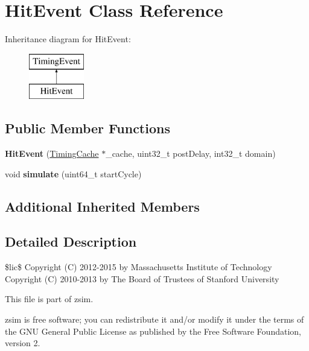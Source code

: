 \hypertarget{classHitEvent}{\section{Hit\-Event Class Reference}
\label{classHitEvent}
}
Inheritance diagram for Hit\-Event\-:\begin{figure}[H]
\begin{center}
\leavevmode
\includegraphics[height=2.000000cm]{classHitEvent}
\end{center}
\end{figure}
\subsection*{Public Member Functions}
\begin{DoxyCompactItemize}
\item 
\hypertarget{classHitEvent_a1a3c3935f5eab43937c515af8d67928d}{{\bfseries Hit\-Event} (\hyperlink{classTimingCache}{Timing\-Cache} $\ast$\-\_\-cache, uint32\-\_\-t post\-Delay, int32\-\_\-t domain)}\label{classHitEvent_a1a3c3935f5eab43937c515af8d67928d}

\item 
\hypertarget{classHitEvent_aa71a04912c1b5df3ae27fb8af88404ae}{void {\bfseries simulate} (uint64\-\_\-t start\-Cycle)}\label{classHitEvent_aa71a04912c1b5df3ae27fb8af88404ae}

\end{DoxyCompactItemize}
\subsection*{Additional Inherited Members}


\subsection{Detailed Description}
\$lic\$ Copyright (C) 2012-\/2015 by Massachusetts Institute of Technology Copyright (C) 2010-\/2013 by The Board of Trustees of Stanford University

This file is part of zsim.

zsim is free software; you can redistribute it and/or modify it under the terms of the G\-N\-U General Public License as published by the Free Software Foundation, version 2.


